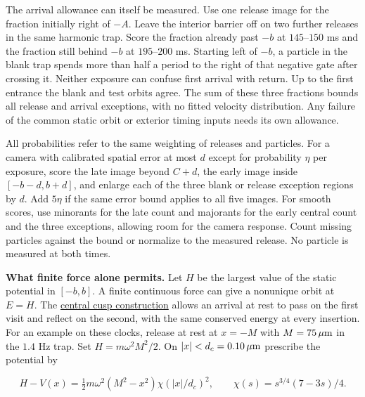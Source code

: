 \documentclass[11pt,a4paper]{article}
\begin{document}
The arrival allowance can itself be measured. Use one release image for
the fraction initially right of \(-A\). Leave the interior barrier off
on two further releases in the same harmonic trap. Score the fraction
already past \(-b\) at \(145\)--\(150\) ms and the fraction still behind
\(-b\) at \(195\)--\(200\) ms. Starting left of \(-b\), a particle in
the blank trap spends more than half a period to the right of that
negative gate after crossing it. Neither exposure can confuse first
arrival with return. Up to the first entrance the blank and test orbits
agree. The sum of these three fractions bounds all release and arrival
exceptions, with no fitted velocity distribution. Any failure of the
common static orbit or exterior timing inputs needs its own allowance.

All probabilities refer to the same weighting of releases and particles.
For a camera with calibrated spatial error at most \(d\) except for
probability \(\eta\) per exposure, score the late image beyond \(C+d\),
the early image inside \([-b-d,b+d]\), and enlarge each of the three
blank or release exception regions by \(d\). Add \(5\eta\) if the same
error bound applies to all five images. For smooth scores, use minorants
for the late count and majorants for the early central count and the
three exceptions, allowing room for the camera response. Count missing
particles against the bound or normalize to the measured release. No
particle is measured at both times.

\textbf{What finite force alone permits.} Let \(H\) be the largest value
of the static potential in \([-b,b]\). A finite continuous force can
give a nonunique orbit at \(E=H\). The
\hyperref[central-force-passage-under-point-insertion]{central cusp
construction} allows an arrival at rest to pass on the first visit and
reflect on the second, with the same conserved energy at every
insertion. For an example on these clocks, release at rest at \(x=-M\)
with \(M=75\,\mu{\rm m}\) in the \(1.4\) Hz trap. Set
\(H=m\omega^2 M^2/2\). On \(|x|<d_c=0.10\,\mu{\rm m}\) prescribe the
potential by

\[
 H-V(x)=\tfrac12 m\omega^2(M^2-x^2)\chi(|x|/d_c)^2,\qquad
 \chi(s)=s^{3/4}(7-3s)/4 .
\]
\end{document}

